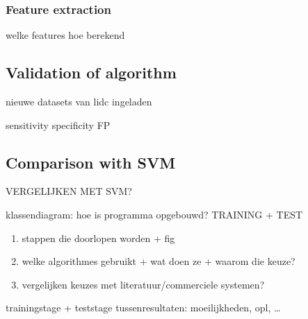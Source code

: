 \subsubsection{Feature extraction} \label{sec:featureExtraction}


welke features
hoe berekend

\subsection{Validation of algorithm}
nieuwe datasets van lidc ingeladen

sensitivity
specificity
FP


\subsection{Comparison with SVM}

VERGELIJKEN MET SVM?






klassendiagram: hoe is programma opgebouwd?
TRAINING + TEST
\begin{enumerate}
\item stappen die doorlopen worden + fig
\item welke algorithmes gebruikt + wat doen ze + waarom die keuze?
\item vergelijken keuzes met literatuur/commerciele systemen?
\end{enumerate}


trainingstage + teststage
tussenresultaten: moeilijkheden, opl, \ldots


